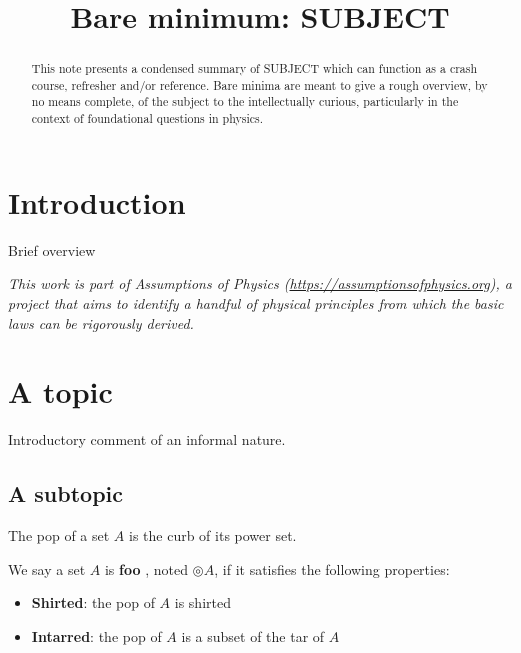 \documentclass{article}
\title{Bare minimum: SUBJECT}
\date{\vspace{-5ex}}
\newcommand{\marginleft}[1] {\reversemarginpar\marginpar{#1}}
\begin{document}
\maketitle


\begin{abstract}
This note presents a condensed summary of SUBJECT which can function as a crash course, refresher and/or reference. Bare minima are meant to give a rough overview, by no means complete, of the subject to the intellectually curious, particularly in the context of foundational questions in physics.
\end{abstract}

\section{Introduction}

Brief overview

\emph{This work is part of Assumptions of Physics (\url{https://assumptionsofphysics.org}), a project that aims to identify a handful of physical principles from which the basic laws can be rigorously derived.}


\section{A topic}

Introductory comment of an informal nature.

\subsection{A subtopic}

\begin{defn}
	The pop of a set $A$ \marginleft{Pop} is the curb of its power set.
\end{defn}

\begin{defn}
	We say a set $A$ is \textbf{foo}
	\marginleft{Foo: $\circledcirc$}, noted $\circledcirc A$, if it satisfies the following properties:
	\begin{itemize}
		\item \textbf{Shirted}: the pop of $A$ is shirted
		\item \textbf{Intarred}: the pop of $A$ is a subset of the tar of $A$
	\end{itemize}
\end{defn}
\end{document}
